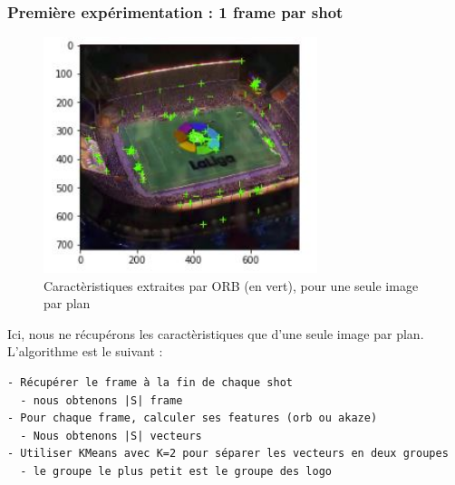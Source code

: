 \documentclass[11pt]{article}
\begin{document}
\subsubsection{Première expérimentation : 1 frame par shot}
\label{sec:orge6e9550}
\begin{figure}[htbp]
\centering
\includegraphics[width=8cm]{orb_simple_res.JPG}
\caption{Caractèristiques extraites par ORB (en vert), pour une seule image par plan}
\end{figure}

Ici, nous ne récupérons les caractèristiques que d'une seule image par plan.\\

L'algorithme est le suivant :\\
\begin{verbatim}
- Récupérer le frame à la fin de chaque shot
  - nous obtenons |S| frame
- Pour chaque frame, calculer ses features (orb ou akaze)
  - Nous obtenons |S| vecteurs
- Utiliser KMeans avec K=2 pour séparer les vecteurs en deux groupes
  - le groupe le plus petit est le groupe des logo
\end{verbatim}
\end{document}
